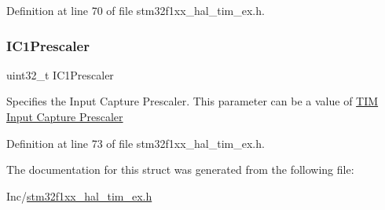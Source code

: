Definition at line 70 of file stm32f1xx\+\_\+hal\+\_\+tim\+\_\+ex.\+h.

\mbox{\label{struct_t_i_m___hall_sensor___init_type_def_aa913a8df0a4c97fefa87ff760fae10cb}} 
\subsubsection{\texorpdfstring{I\+C1\+Prescaler}{IC1Prescaler}}
{\footnotesize\ttfamily uint32\+\_\+t I\+C1\+Prescaler}

Specifies the Input Capture Prescaler. This parameter can be a value of \hyperlink{group___t_i_m___input___capture___prescaler}{T\+IM Input Capture Prescaler} 

Definition at line 73 of file stm32f1xx\+\_\+hal\+\_\+tim\+\_\+ex.\+h.



The documentation for this struct was generated from the following file\+:\begin{DoxyCompactItemize}
\item 
Inc/\hyperlink{stm32f1xx__hal__tim__ex_8h}{stm32f1xx\+\_\+hal\+\_\+tim\+\_\+ex.\+h}\end{DoxyCompactItemize}

